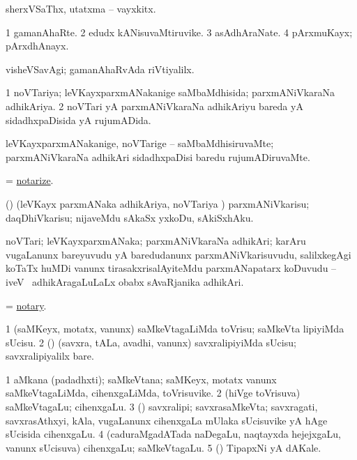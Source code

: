 \bentry
{}
\gl{\nA}
\bmng
sherxVSaThx, utatxma -- vayxkitx. 
\emng
\eentry

\bentry
{}
\gl{\nA}
\bmng
\bnum
\num{1} gamanAhaRte. 
\num{2} edudx kANisuvaMtiruvike. 
\num{3} asAdhAraNate. 
\num{4} pArxmuKayx; pArxdhAnayx. 
\enum
\emng
\eentry

\bentry
{}
\gl{\kirxvi}
\bmng
visheVSavAgi; gamanAhaRvAda riVtiyalilx. 
\emng
\eentry

\bentry
{}
\gl{\gu}
\bmng
\bnum
\num{1} noVTariya; leVKayxparxmANakanige saMbaMdhisida; parxmANiVkaraNa adhikAriya. 
\num{2} noVTari yA parxmANiVkaraNa adhikAriyu bareda yA sidadhxpaDisida yA rujumADida. 
\enum
\emng
\eentry

\bentry
{}
\gl{\kirxvi}
\bmng
leVKayxparxmANakanige, noVTarige -- saMbaMdhisiruvaMte; parxmANiVkaraNa adhikAri sidadhxpaDisi baredu rujumADiruvaMte. 
\emng
\eentry

\bentry
{}
\gl{\sakirx}
\bmng
= \hyperlink{notarize}{notarize}. 
\emng
\eentry

\bentry
{}
\gl{\sakirx}
\bmng
(\ame) (leVKayx parxmANaka adhikAriya, noVTariya \vi) parxmANiVkarisu; daqDhiVkarisu; nijaveMdu sAkaSx yxkoDu, sAkiSxhAku. 
\emng
\eentry

\bentry
{}
\gl{\nA}
\bmng
noVTari; leVKayxparxmANaka; parxmANiVkaraNa adhikAri; karAru \mo vugaLanunx bareyuvudu yA baredudanunx parxmANiVkarisuvudu, salilxkegAgi koTaTx huMDi \mo vanunx tirasakxrisalAyiteMdu parxmANapatarx koDuvudu -- iveV \mo\ adhikAragaLuLaLx obabx sAvaRjanika adhikAri. 
\emng
\eentry

\bentry
{}
\gl{\nA}
\bmng
= \hyperlink{notary}{notary}. 
\emng
\eentry

\bentry
{}
\gl{\sakirx}
\bmng
\bnum
\num{1} (saMKeyx, motatx, \mo vanunx) saMkeVtagaLiMda toVrisu; saMkeVta lipiyiMda sUcisu. 
\num{2} (\saM) (savxra, tALa, avadhi, \mo vanunx) savxralipiyiMda sUcisu; savxralipiyalilx bare. 
\enum
\emng
\eentry

\bentry
{}
\gl{\nA}
\bmng
\bnum
\num{1} aMkana (padadhxti); saMkeVtana; saMKeyx, motatx \mo vanunx saMkeVtagaLiMda, cihenxgaLiMda, toVrisuvike. 
\num{2} (hiVge toVrisuva) saMkeVtagaLu; cihenxgaLu. 
\num{3} (\saM) savxralipi; savxrasaMkeVta; savxragati, savxrasAthxyi, kAla, \mo vugaLanunx cihenxgaLa mUlaka sUcisuvike yA hAge sUcisida cihenxgaLu. 
\num{4} (caduraMgadATada naDegaLu, naqtayxda hejejxgaLu, \mo vanunx sUcisuva) cihenxgaLu; saMkeVtagaLu. 
\num{5} (\ame) TipapxNi yA dAKale. 
\enum
\emng

